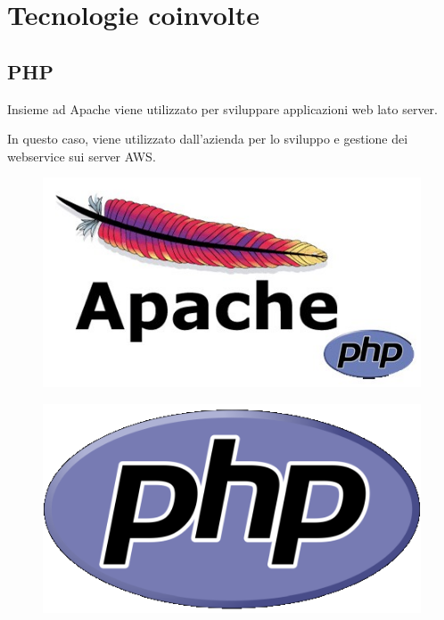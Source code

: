 
\chapter{Tecnologie coinvolte}
\label{cap:tecnologie-coinvolte}
\section{PHP}
\begin{flushleft}
	Insieme ad Apache viene utilizzato per sviluppare applicazioni web lato server.
	
	In questo caso, viene utilizzato dall'azienda per lo sviluppo e gestione dei webservice sui server AWS.
\end{flushleft}
\begin{figure}[!h] 
	\centering
	\includegraphics[scale = 1]{immagini/tecnologie/apache}
\end{figure}
\begin{figure}[!h] 
	\centering
	\includegraphics[scale = 0.3]{immagini/tecnologie/php}
\end{figure}
